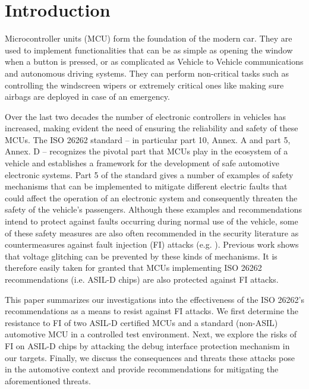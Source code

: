 \documentclass[10pt, conference, compsocconf]{IEEEtran}
\begin{document}
\section{Introduction}
Microcontroller units (MCU) form the foundation of the modern car. They are used to implement functionalities that can be as simple as opening the window when a button is pressed, or as complicated as Vehicle to Vehicle communications and autonomous driving systems. They can perform non-critical tasks such as controlling the windscreen wipers or extremely critical ones like making sure airbags are deployed in case of an emergency. 
 
Over the last two decades the number of electronic controllers in vehicles has increased, making evident the need of ensuring the reliability and safety of these MCUs. 
The ISO 26262 standard \cite{iso26262} -- in particular part 10, Annex. A and part 5, Annex. D -- recognizes the pivotal part that MCUs play in the ecosystem of a vehicle and establishes a framework for the development of safe automotive electronic systems. Part 5 of the standard gives a number of examples of safety mechanisms that can be implemented to mitigate different electric faults that could affect the operation of an electronic system and consequently threaten the safety of the vehicle's passengers. Although these examples and recommendations intend to protect against faults occurring during normal use of the vehicle, some of these safety measures are also often recommended in the security literature as countermeasures against fault injection (FI) attacks (e.g. \cite{bar-el_sorcerers_2006-1}).  Previous work \cite{tummeltshammer_power_2009} shows that voltage glitching can be prevented by these kinds of mechanisms.
It is therefore easily taken for granted that MCUs implementing ISO 26262 recommendations (i.e. ASIL-D chips) are also protected against FI attacks.

This paper summarizes our investigations into 
the effectiveness of the ISO 26262's recommendations as a means to resist against FI attacks. We first determine the resistance to FI of two ASIL-D certified MCUs and a standard (non-ASIL) automotive MCU in a controlled test environment. Next, we explore the risks of FI on ASIL-D chips by attacking the debug interface protection mechanism in our targets. Finally, we discuss the consequences and threats these attacks pose in the automotive context and provide recommendations for mitigating the aforementioned threats.
\end{document}

